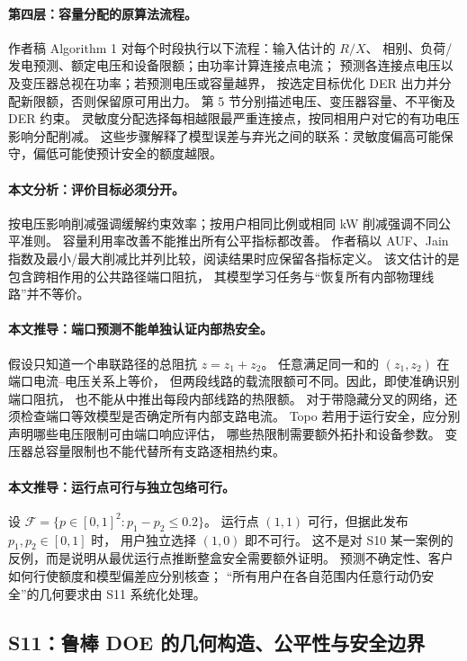 \documentclass[UTF8,11pt,fontset=fandol]{ctexart}
\theoremstyle{remark}
\numberwithin{equation}{section}
\begin{document}
\paragraph{第四层：容量分配的原算法流程。}
作者稿 Algorithm 1 对每个时段执行以下流程：输入估计的 $R/X$、
相别、负荷/发电预测、额定电压和设备限额；由功率计算连接点电流；
预测各连接点电压以及变压器总视在功率；若预测电压或容量越界，
按选定目标优化 DER 出力并分配新限额，否则保留原可用出力。
第 5 节分别描述电压、变压器容量、不平衡及 DER 约束。
灵敏度分配选择每相越限最严重连接点，按同相用户对它的有功电压影响分配削减。
这些步骤解释了模型误差与弃光之间的联系：灵敏度偏高可能保守，偏低可能使预计安全的额度越限。

\paragraph{本文分析：评价目标必须分开。}
按电压影响削减强调缓解约束效率；按用户相同比例或相同 kW 削减强调不同公平准则。
容量利用率改善不能推出所有公平指标都改善。
作者稿以 AUF、Jain 指数及最小/最大削减比并列比较，阅读结果时应保留各指标定义。
该文估计的是包含跨相作用的公共路径端口阻抗，
其模型学习任务与“恢复所有内部物理线路”并不等价。

\paragraph{本文推导：端口预测不能单独认证内部热安全。}
假设只知道一个串联路径的总阻抗 $z=z_1+z_2$。
任意满足同一和的 $(z_1,z_2)$ 在端口电流--电压关系上等价，
但两段线路的载流限额可不同。因此，即使准确识别端口阻抗，
也不能从中推出每段内部线路的热限额。
对于带隐藏分叉的网络，还须检查端口等效模型是否确定所有内部支路电流。
Topo 若用于运行安全，应分别声明哪些电压限制可由端口响应评估，
哪些热限制需要额外拓扑和设备参数。
变压器总容量限制也不能代替所有支路逐相热约束。

\paragraph{本文推导：运行点可行与独立包络可行。}
设 $\mathcal F=\{p\in[0,1]^2:p_1-p_2\leq0.2\}$。
运行点 $(1,1)$ 可行，但据此发布 $p_1,p_2\in[0,1]$ 时，
用户独立选择 $(1,0)$ 即不可行。
这不是对 S10 某一案例的反例，而是说明从最优运行点推断整盒安全需要额外证明。
预测不确定性、客户如何行使额度和模型偏差应分别核查；
“所有用户在各自范围内任意行动仍安全”的几何要求由 S11 系统化处理。

\subsection{S11：鲁棒 DOE 的几何构造、公平性与安全边界}
\label{subsec:S11}
\end{document}
